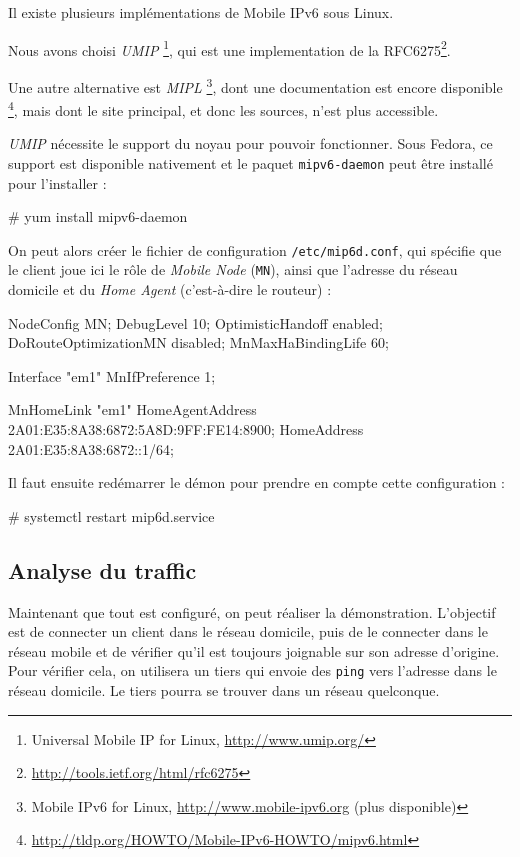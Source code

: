 Il existe plusieurs implémentations de Mobile IPv6 sous Linux.

Nous avons choisi \emph{UMIP} \footnote{Universal Mobile IP for Linux, \url{http://www.umip.org/}}, qui est une implementation de la RFC6275\footnote{\url{http://tools.ietf.org/html/rfc6275}}.

Une autre alternative est \emph{MIPL} \footnote{Mobile IPv6 for Linux, \url{http://www.mobile-ipv6.org} (plus disponible)}, dont une documentation est encore disponible \footnote{\url{http://tldp.org/HOWTO/Mobile-IPv6-HOWTO/mipv6.html}}, mais dont le site principal, et donc les sources, n'est plus accessible.

\emph{UMIP} nécessite le support du noyau pour pouvoir fonctionner. Sous Fedora, ce support est disponible nativement et le paquet \texttt{mipv6-daemon} peut être installé pour l'installer :

\begin{code}
# yum install mipv6-daemon
\end{code}

On peut alors créer le fichier de configuration \texttt{/etc/mip6d.conf}, qui spécifie que le client joue ici le rôle de \emph{Mobile Node} (\texttt{MN}), ainsi que l'adresse du réseau domicile et du \emph{Home Agent} (c'est-à-dire le routeur) :

\begin{code}
NodeConfig MN;
DebugLevel 10;
OptimisticHandoff enabled;
DoRouteOptimizationMN disabled;
MnMaxHaBindingLife 60;

Interface "em1" {
  MnIfPreference 1;
}

MnHomeLink "em1" {
  HomeAgentAddress 2A01:E35:8A38:6872:5A8D:9FF:FE14:8900;
  HomeAddress 2A01:E35:8A38:6872::1/64;
}
\end{code}

Il faut ensuite redémarrer le démon pour prendre en compte cette configuration :

\begin{code}
# systemctl restart mip6d.service
\end{code}

\subsection{Analyse du traffic}

Maintenant que tout est configuré, on peut réaliser la démonstration.
L'objectif est de connecter un client dans le réseau domicile, puis de le connecter dans le réseau mobile et de vérifier qu'il est toujours joignable sur son adresse d'origine.
Pour vérifier cela, on utilisera un tiers qui envoie des \texttt{ping} vers l'adresse dans le réseau domicile.
Le tiers pourra se trouver dans un réseau quelconque.

